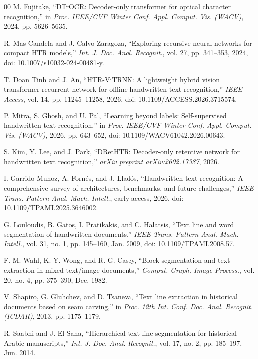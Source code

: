 \documentclass{IEEEtran}
\begin{document}
\begin{thebibliography}{00}
 M. Fujitake, ``DTrOCR: Decoder-only transformer for optical character recognition,'' in \emph{Proc. IEEE/CVF Winter Conf. Appl. Comput. Vis. (WACV)}, 2024, pp. 5626--5635.

 R. Mas-Candela and J. Calvo-Zaragoza, ``Exploring recursive neural networks for compact HTR models,'' \emph{Int. J. Doc. Anal. Recognit.}, vol. 27, pp. 341--353, 2024, doi: 10.1007/s10032-024-00481-y.

 T. Doan Tinh and J. An, ``HTR-ViTRNN: A lightweight hybrid vision transformer recurrent network for offline handwritten text recognition,'' \emph{IEEE Access}, vol. 14, pp. 11245--11258, 2026, doi: 10.1109/ACCESS.2026.3715574.

 P. Mitra, S. Ghosh, and U. Pal, ``Learning beyond labels: Self-supervised handwritten text recognition,'' in \emph{Proc. IEEE/CVF Winter Conf. Appl. Comput. Vis. (WACV)}, 2026, pp. 643--652, doi: 10.1109/WACV61042.2026.00643.

 S. Kim, Y. Lee, and J. Park, ``DRetHTR: Decoder-only retentive network for handwritten text recognition,'' \emph{arXiv preprint arXiv:2602.17387}, 2026.

 I. Garrido-Munoz, A. Forn{\'e}s, and J. Llad{\'o}s, ``Handwritten text recognition: A comprehensive survey of architectures, benchmarks, and future challenges,'' \emph{IEEE Trans. Pattern Anal. Mach. Intell.}, early access, 2026, doi: 10.1109/TPAMI.2025.3646002.

 G. Louloudis, B. Gatos, I. Pratikakis, and C. Halatsis, ``Text line and word segmentation of handwritten documents,'' \emph{IEEE Trans. Pattern Anal. Mach. Intell.}, vol. 31, no. 1, pp. 145--160, Jan. 2009, doi: 10.1109/TPAMI.2008.57.

 F. M. Wahl, K. Y. Wong, and R. G. Casey, ``Block segmentation and text extraction in mixed text/image documents,'' \emph{Comput. Graph. Image Process.}, vol. 20, no. 4, pp. 375--390, Dec. 1982.

 V. Shapiro, G. Gluhchev, and D. Tsaneva, ``Text line extraction in historical documents based on seam carving,'' in \emph{Proc. 12th Int. Conf. Doc. Anal. Recognit. (ICDAR)}, 2013, pp. 1175--1179.

 R. Saabni and J. El-Sana, ``Hierarchical text line segmentation for historical Arabic manuscripts,'' \emph{Int. J. Doc. Anal. Recognit.}, vol. 17, no. 2, pp. 185--197, Jun. 2014.


\end{thebibliography}
\end{document}
